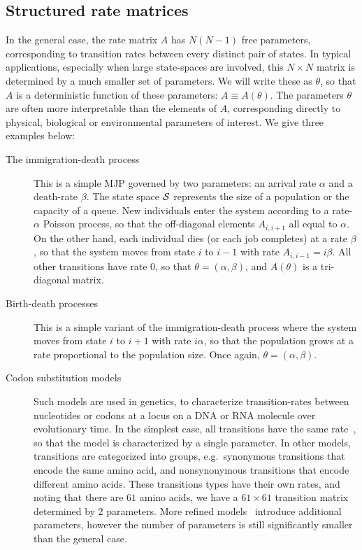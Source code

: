\subsection{Structured rate matrices}
In the general case, the rate matrix $A$ has $N(N-1)$ free parameters,
corresponding to transition rates between every distinct pair of states. 
In typical applications, especially when large state-spaces
are involved, this $N \times N$ matrix is determined by a much smaller
set of parameters. We will write these as $\theta$, so that 
$A$ is a deterministic function of these parameters: 
$A \equiv A(\theta)$. The parameters $\theta$ are often more 
interpretable than the elements of $A$, corresponding directly to
physical, biological or environmental parameters of interest. 
We give three examples below:
\begin{description}
  \item[The immigration-death process] This is a simple MJP governed
    by two parameters: an arrival rate $\alpha$ and a death-rate
    $\beta$. The state space ${\mathcal S}$ represents the size of a 
    population or the capacity of a queue. New individuals
    enter the system according to a rate-$\alpha$ Poisson process,
    so that the off-diagonal elements $A_{i,i+1}$ all equal to $\alpha$.
    On the other hand, each individual dies (or each job completes) 
    at a rate $\beta$, so that the system moves from state $i$ to 
    $i-1$ with rate $A_{i,i-1}=i\beta$.
    All other transitions have rate $0$, so that $\theta = (\alpha,\beta)$,
    and $A(\theta)$ is a tri-diagonal matrix.
  \item[Birth-death processes] This is a simple variant of the
    immigration-death process where the system moves from state $i$ 
    to $i+1$ with rate $i\alpha$, so that the population grows at a 
    rate proportional to the population size. Once again, 
    $\theta=(\alpha,\beta)$.
  \item[Codon substitution models] Such models are used in genetics,
    to characterize transition-rates between nucleotides or codons at a locus on
    a DNA or RNA molecule over evolutionary time. In the simplest case,
    all transitions have the same rate~\cite{jukescantor69}, so that the model is 
    characterized by a single parameter. In other models, transitions are categorized
    into groups, e.g.\ synonymous transitions that encode the same amino acid, and 
    nonsynonymous transitions that encode different amino acids. 
    These transitions types have their own rates, and noting that 
    there are $61$ amino acids, we have a $61\times 61$ transition
    matrix determined by 2 parameters. More refined models~\cite{goldman1994codon} 
    introduce additional parameters, however the number of parameters is still
    significantly smaller than the general case.
\end{description}
